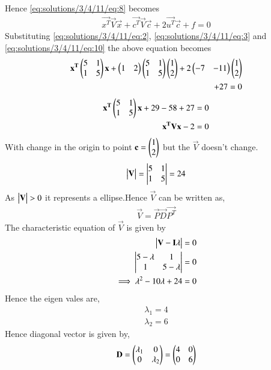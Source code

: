 Hence \eqref{eq:solutions/3/4/11/eq:8} becomes
\begin{align}
\vec{x^T}\vec{V}\vec{x}+\vec{c^T}\vec{V}\vec{c}+2\vec{u^T}\vec{c}+f = 0 \label{eq:solutions/3/4/11/eq:11}
\end{align}
Substituting \eqref{eq:solutions/3/4/11/eq:2}, \eqref{eq:solutions/3/4/11/eq:3} and \eqref{eq:solutions/3/4/11/eq:10} the above equation becomes
\begin{align}
\mathbf{x^T}\begin{pmatrix}5&1\\1&5\end{pmatrix}\mathbf{x}+\begin{pmatrix}1&2\end{pmatrix}\begin{pmatrix}5&1\\1&5\end{pmatrix}\begin{pmatrix}1\\2\end{pmatrix}+2\begin{pmatrix}-7&-11\end{pmatrix}\begin{pmatrix}1\\2\end{pmatrix}\\+27 = 0
\end{align}
\begin{align}
\mathbf{x^T}\begin{pmatrix}5&1\\1&5\end{pmatrix}\mathbf{x}+29-58+27=0\\
\mathbf{x^T}\mathbf{V}\mathbf{x}-2 = 0\label{eq:solutions/3/4/11/eq:12}
\end{align}
With change in the origin to point $\mathbf{c}=\begin{pmatrix}1\\2\end{pmatrix}$ but the $\vec{V}$ doesn't change.
\begin{align}
\begin{vmatrix}\mathbf{V}\end{vmatrix} = \begin{vmatrix}5&1\\1&5\end{vmatrix} = 24
\end{align}
As $\begin{vmatrix}\mathbf{V}\end{vmatrix} >0$ it represents a ellipse.Hence $\vec{V}$ can be written as,
\begin{align}
\vec{V}=\vec{P}\vec{D}\vec{P^T}\label{eq:solutions/3/4/11/eq:13}
\end{align}
 The characteristic equation of $\vec{V}$ is given by
\begin{align}
\begin{vmatrix}\mathbf{V}-\mathbf{I}\lambda\end{vmatrix} = 0\\
\begin{vmatrix}5-\lambda & 1\\1& 5-\lambda\end{vmatrix} =0\\
\implies \lambda^2 - 10\lambda+24 = 0
\end{align}
Hence the eigen vales are,
\begin{align}
\lambda_1 = 4\\
\lambda_2 = 6
\end{align}
Hence diagonal vector is given by,
\begin{align}
\mathbf{D}= \begin{pmatrix}\lambda_1&0\\0&\lambda_2\end{pmatrix} = \begin{pmatrix}4&0\\0&6\end{pmatrix}\label{eq:solutions/3/4/11/eq:14}
\end{align}
